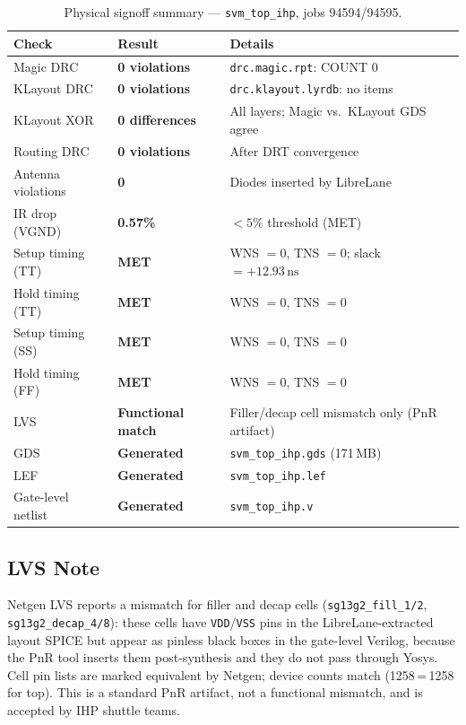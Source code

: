 \documentclass[11pt]{article}
\begin{document}
\begin{table}[H]
  \centering
  \caption{Physical signoff summary --- \texttt{svm\_top\_ihp}, jobs 94594/94595.}
  \label{tab:signoff}
  \small
  \begin{tabular}{lll}
    \toprule
    Check & Result & Details \\
    \midrule
    Magic DRC          & \textbf{0 violations} & \texttt{drc.magic.rpt}: COUNT 0 \\
    KLayout DRC        & \textbf{0 violations} & \texttt{drc.klayout.lyrdb}: no items \\
    KLayout XOR        & \textbf{0 differences} & All layers; Magic vs.\ KLayout GDS agree \\
    Routing DRC        & \textbf{0 violations} & After DRT convergence \\
    Antenna violations & \textbf{0}            & Diodes inserted by LibreLane \\
    IR drop (VGND)     & \textbf{0.57\%}       & $<5\%$ threshold (MET) \\
    Setup timing (TT)  & \textbf{MET}          & WNS $= 0$, TNS $= 0$; slack $= +12.93\,\mathrm{ns}$ \\
    Hold timing (TT)   & \textbf{MET}          & WNS $= 0$, TNS $= 0$ \\
    Setup timing (SS)  & \textbf{MET}          & WNS $= 0$, TNS $= 0$ \\
    Hold timing (FF)   & \textbf{MET}          & WNS $= 0$, TNS $= 0$ \\
    LVS                & \textbf{Functional match} & Filler/decap cell mismatch only (PnR artifact) \\
    GDS                & \textbf{Generated}    & \texttt{svm\_top\_ihp.gds} (171\,MB) \\
    LEF                & \textbf{Generated}    & \texttt{svm\_top\_ihp.lef} \\
    Gate-level netlist & \textbf{Generated}    & \texttt{svm\_top\_ihp.v} \\
    \bottomrule
  \end{tabular}
\end{table}

\subsection{LVS Note}

Netgen LVS reports a mismatch for filler and decap cells
(\texttt{sg13g2\_fill\_1/2}, \texttt{sg13g2\_decap\_4/8}): these cells have
\texttt{VDD}/\texttt{VSS} pins in the LibreLane-extracted layout SPICE but
appear as pinless black boxes in the gate-level Verilog, because the PnR tool
inserts them post-synthesis and they do not pass through Yosys.  Cell pin lists
are marked equivalent by Netgen; device counts match (1258\,=\,1258 for top).
This is a standard PnR artifact, not a functional mismatch, and is accepted by
IHP shuttle teams.
\end{document}
